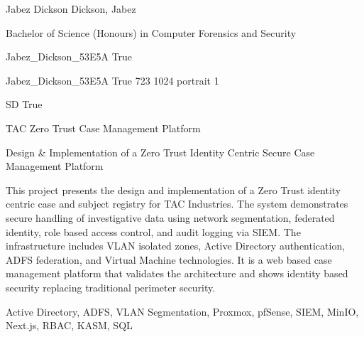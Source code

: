 \documentclass[twoside]{report}
\begin{document}
\begingroup{}\relax



\def\Key{Jabez_Dickson_53E5A}

{Jabez Dickson}
{Dickson, Jabez}

{Bachelor of Science (Honours) in Computer Forensics and Security}

{Jabez_Dickson_53E5A}
{True}

{Jabez_Dickson_53E5A}
{True}
{723}
{1024}
{portrait}
{1}

{SD}
{True}

{TAC Zero Trust Case Management Platform}

{Design \& Implementation of a Zero Trust Identity Centric Secure Case Management Platform}

{This project presents the design and implementation of a Zero Trust identity centric case and subject registry for TAC Industries.  The system demonstrates secure handling of investigative data using network segmentation, federated identity, role based access control, and audit logging via SIEM.  The infrastructure includes VLAN isolated zones, Active Directory authentication, ADFS federation, and Virtual Machine technologies. It is a web based case management platform that validates the architecture and shows identity based security replacing traditional perimeter security.}

{Active Directory, ADFS, VLAN Segmentation, Proxmox, pfSense, SIEM, MinIO, Next.js, RBAC, KASM, SQL}
\end{document}
